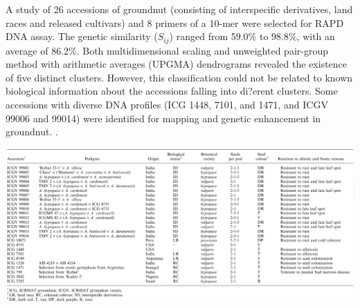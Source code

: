 \documentclass[
  ignorenonframetext,
  aspectratio=169]{beamer}
\begin{document}
\begin{frame}{}
\protect\hypertarget{section-1}{}
\scriptsize

A study of 26 accessions of groundnut (consisting of interspecific
derivatives, land races and released cultivars) and 8 primers of a
10-mer were selected for RAPD DNA assay. The genetic similarity
(\(S_{ij}\)) ranged from 59.0\% to 98.8\%, with an average of 86.2\%.
Both multidimensional scaling and unweighted pair-group method with
arithmetic averages (UPGMA) dendrograms revealed the existence of five
distinct clusters. However, this classification could not be related to
known biological information about the accessions falling into di?erent
clusters. Some accessions with diverse DNA profiles (ICG 1448, 7101, and
1471, and ICGV 99006 and 99014) were identified for mapping and genetic
enhancement in groundnut. \citep{dwivedi2001assessment}.

\begin{center}\includegraphics[width=0.8\linewidth]{../images/Groundnut_diversity} \end{center}
\end{frame}
\end{document}
